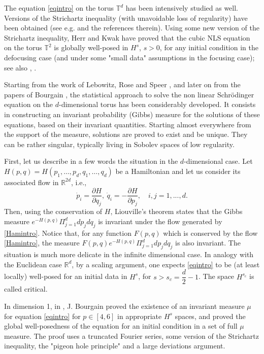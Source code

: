 \documentclass[11pt,leqno]{amsart}
\newcommand{\R}{\mathbb{R}}
\newcommand{\T}{\mathbb{T}}
\begin{document}
The equation \eqref{eqintro}   on the torus $\T^d$ has been intensively studied as well.  Versions of the Strichartz inequality (with unavoidable loss of regularity) have been obtained
(see e.g. \cite{MR3512894} and the references therein).
Using some new version of the Strichartz inequality, Herr and Kwak  \cite{herr2024strichartz} 
have proved that the cubic NLS equation
on the torus ${\mathbb T}^2$ is globally well-posed in  $H^s$, $s>0$, for any initial condition in the defocusing case (and under some "small data" assumptions in the focusing case); see also \cite{MR3512894}, \cite{kwak2024critical}.

Starting from the work of Lebowitz, Rose and Speer \cite{LRS}, and later on from the papers of Bourgain \cite{B93, B94,B96}, the statistical approach to solve the non linear  Schr\"odinger equation
 on the $d$-dimensional torus has been considerably developed. 
 It consists in constructing an invariant probability (Gibbs) measure for the solutions of these equations, based on their invariant quantities.
 Starting almost everywhere from the support of the measure,  solutions are proved to exist and be unique.  They  can be rather singular, typically living in Sobolev spaces of low regularity. 
\smallskip

 First, let us describe in a few words the situation in the $d$-dimensional case. 
 Let $H(p,q)=H(p_1 ,\ldots ,p_d , q_1 ,\ldots ,q_d)$ be a Hamiltonian and let us consider its associated flow in $\R^{2d}$, i.e., 
\begin{equation}
\label{Hamintro}
\dot{p}_i = \dfrac{\partial H}{\partial q_j},\ \dot{q}_i=-\dfrac{\partial H}{\partial p_j}, \quad  i,j=1, ...,d.
\end{equation}
Then, using the conservation of $H$, Liouville's theorem states that the Gibbs measure $e^{-H(p,q)} \Pi_{j=1}^d dp_j dq_j$ is invariant under the flow generated by 
\eqref{Hamintro}. Notice that, for any %
function $F(p,q)$ which is conserved by the flow \eqref{Hamintro}, the measure $F(p,q) e^{-H(p,q)} \Pi_{j=1}^d dp_j dq_j $ is also invariant. 
The situation is much more delicate in the infinite dimensional case. 
 In analogy with the Euclidean case $\R^d$, by a scaling argument, one expects \eqref{eqintro} to be (at least locally) well-posed for an initial data in $H^{s}$, for $s>s_c= \dfrac{d}{2}-1$. 
The space $H^{s_c}$ is called critical.
\smallskip

In dimension 1, in \cite{B93,B94}, J. Bourgain proved the existence of an invariant measure $\mu$ for equation \eqref{eqintro} for $p\in [4,6]$ in appropriate $H^s$ spaces, and proved the global
well-posedness of the equation for an initial condition in a set of full $\mu$ measure.
 The proof uses a truncated Fourier series, some version of the Strichartz inequality, the "pigeon hole principle" and a large deviations argument. 
\bigskip
\end{document}
